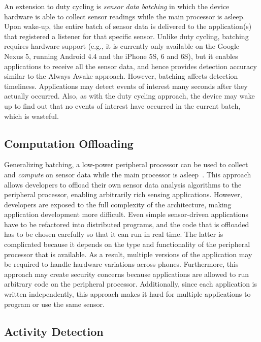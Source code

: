 An extension to duty cycling is \emph{sensor data batching} in which
the device hardware is able to collect sensor readings while the main
processor is asleep.  Upon wake-up, the entire batch of sensor data is
delivered to the application(s) that registered a listener for that
specific sensor.  Unlike duty cycling, batching requires hardware
support (e.g., it is currently only available on the 
Google Nexus 5, running Android 4.4 and the iPhone 5S, 6 and 6S), 
but it enables applications to
receive all the sensor data, and hence provides detection accuracy
similar to the Always Awake approach.  However, batching affects
detection timeliness.  Applications may detect events of interest many
seconds after they actually occurred.  Also, as with the duty cycling
approach, the device may wake up to find out that no events of
interest have occurred in the current batch, which is wasteful.

\subsection{Computation Offloading}
\label{subsec:computationOffloading}

Generalizing batching, a low-power peripheral processor can be used to
collect and \emph{compute} on sensor data while the main processor is
asleep~\cite{reflex,turducken}.  This approach allows developers to
offload their own sensor data analysis algorithms to the peripheral
processor, enabling arbitrarily rich sensing applications.  However,
developers are exposed to the full complexity of the architecture,
making application development more difficult.  Even simple
sensor-driven applications have to be refactored into distributed
programs, and the code that is offloaded has to be chosen
carefully so that it can run in real time.  The latter is complicated
because it depends on the type and functionality of the peripheral
processor that is available.  As a result, multiple versions of the
application may be required to handle hardware variations across
phones.  Furthermore, this approach may create security concerns
because applications are allowed to run arbitrary code on the
peripheral processor.  Additionally, since each application is written independently,
this approach makes it hard for multiple applications to program or
use the same sensor.

\subsection{Activity Detection}

